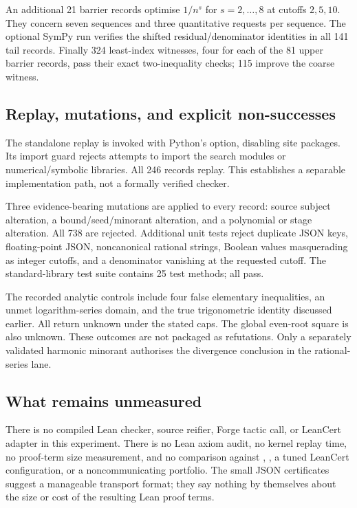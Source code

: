 \documentclass[11pt,a4paper]{article}
\theoremstyle{definition}\newtheorem{definition}[theorem]{Definition}
\newcommand{\code}[1]{\texttt{\detokenize{#1}}}
\newcommand{\Unknown}{\textsf{unknown}}
\begin{document}
An additional 21 barrier records optimise $1/n^s$ for $s=2,\ldots,8$ at
cutoffs $2,5,10$. They concern seven sequences and three quantitative requests
per sequence. The optional SymPy run verifies the shifted residual/denominator
identities in all 141 tail records. Finally 324 least-index witnesses, four for
each of the 81 upper barrier records, pass their exact two-inequality checks;
115 improve the coarse witness.

\subsection{Replay, mutations, and explicit non-successes}

The standalone replay is invoked with Python's \code{-S} option, disabling
site packages. Its import guard rejects attempts to import the search modules
or numerical/symbolic libraries. All 246 records replay. This establishes a
separable implementation path, not a formally verified checker.

Three evidence-bearing mutations are applied to every record: source subject
alteration, a bound/seed/minorant alteration, and a polynomial or stage alteration.
All 738 are rejected. Additional unit tests reject duplicate JSON keys,
floating-point JSON, noncanonical rational strings, Boolean values masquerading
as integer cutoffs, and a denominator vanishing at the requested cutoff.
The standard-library test suite contains 25 test methods; all pass.

The recorded analytic controls include four false elementary inequalities, an
unmet logarithm-series domain, and the true trigonometric identity discussed
earlier. All return \Unknown{} under the stated caps. The global even-root
square is also \Unknown{}. These outcomes are not packaged as refutations.
Only a separately validated harmonic minorant authorises the divergence
conclusion in the rational-series lane.

\subsection{What remains unmeasured}

There is no compiled Lean checker, source reifier, Forge tactic call, or
LeanCert adapter in this experiment. There is no Lean axiom audit, no kernel
replay time, no proof-term size measurement, and no comparison against
\code{grind}, \code{nlinarith}, a tuned LeanCert configuration, or a
noncommunicating portfolio. The small JSON certificates suggest a manageable
transport format; they say nothing by themselves about the size or cost of the
resulting Lean proof terms.
\end{document}

